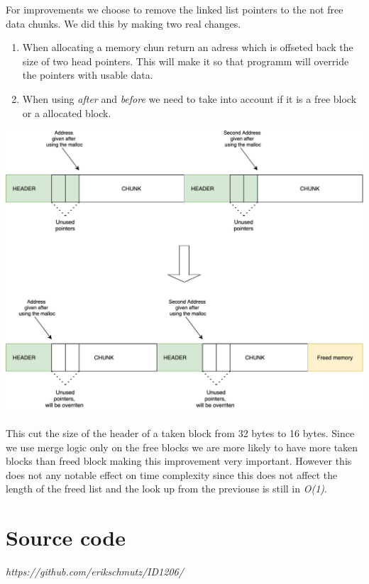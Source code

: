 \documentclass{article}
\begin{document}
For improvements we choose to remove the linked list pointers to the not free data chunks. We did this by making two real changes.

\begin{enumerate}
    \item When allocating a memory chun return an adress which is offseted back the size of two head pointers. This will make it so that programm will override the pointers with usable data.
    \item When using \emph{after} and \emph{before} we need to take into account if it is a free block or a allocated block. 
\end{enumerate}



\begin{center}
    \includegraphics[scale=0.12]{images/no-pointer-on-taken.png}
\end{center}
     
     
This cut the size of the header of a taken block from 32 bytes to 16 bytes. Since we use merge logic only on the free blocks we are more likely to have more taken blocks than freed block making this improvement very important. 
However this does not any notable effect on time complexity since this does not affect the length of the freed list and the look up from the previouse is still in \emph{O(1)}.



\section{Source code}


\emph{https://github.com/erikschmutz/ID1206/}
\end{document}

